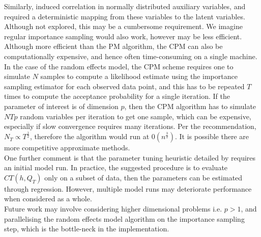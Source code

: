\documentclass{article}
\begin{document}
Similarly, \cite{cpmmDeligiannidis2015} induced correlation in normally distributed auxiliary variables, and required a deterministic mapping from these variables to the latent variables. Although not explored, this may be a cumbersome requirement. We imagine regular importance sampling would also work, however may be less efficient. \\

Although more efficient than the PM algorithm, the CPM can also be computationally expensive, and hence often time-consuming on a single machine. In the case of the random effects model, the CPM scheme requires one to simulate $N$ samples to compute a likelihood estimate using the importance sampling estimator for each observed data point, and this has to be repeated $T$ times to compute the acceptance probability for a single iteration. If the parameter of interest is of dimension $p$, then the CPM algorithm has to simulate $NTp$ random variables per iteration to get one sample, which can be expensive, especially if slow convergence requires many iterations. Per the recommendation, $N_T \propto T^{\frac{1}{2}}$, therefore the algorithm would run at $0(n^{\frac{3}{2}})$. It is possible there are more competitive approximate methods.\\

One further comment is that the parameter tuning heuristic detailed by \cite{cpmmDeligiannidis2015} requires an initial model run. In practice, the suggested procedure is to evaluate $CT(h, Q_{T})$ only on a subset of data, then the parameters can be estimated through regression. However, multiple model runs may deteriorate performance when considered as a whole.\\

Future work may involve considering higher dimensional problems i.e. $p>1$, and parallelising the random effects model algorithm on the importance sampling step, which is the bottle-neck in the implementation.



\end{document}
